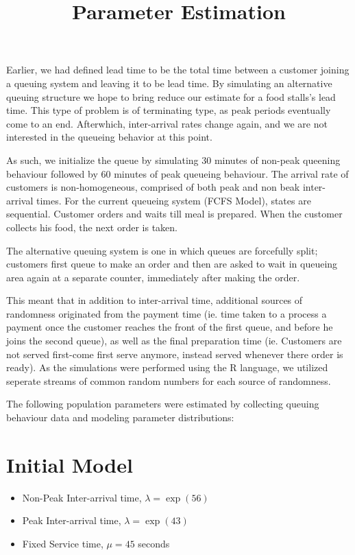 \documentclass{article}
\begin{document}
\pagecolor{ultramarine}

\title{Parameter Estimation}
\author{}
\date{}
\maketitle
Earlier, we had defined lead time to be the total time between a customer joining a queuing system and leaving it to be lead time. By simulating an alternative queuing structure we hope to bring reduce our estimate for a food stalls's lead time. This type of problem is of terminating type, as peak periods eventually come to an end. Afterwhich, inter-arrival rates change again, and we are not interested in the queueing behavior at this point.
\newline

As such, we initialize the queue by simulating 30 minutes of non-peak queening behaviour followed by 60 minutes of peak queueing behaviour. The arrival rate of customers is non-homogeneous, comprised of both peak and non beak inter-arrival times.
\newline
For the current queueing system (FCFS Model), states are sequential. Customer orders and waits till meal is prepared. When the customer collects his food, the next order is taken.
\newline

The alternative queuing system is one in which queues are forcefully split; customers first queue to make an order and then are asked to wait in queueing area again at a separate counter, immediately after making the order. 
\newline

This meant that in addition to inter-arrival time, additional sources of randomness originated from the payment time (ie. time taken to a process a payment once the customer reaches the front of the first queue, and before he joins the second queue), as well as the final preparation time (ie. Customers are not served first-come first serve anymore, instead served whenever there order is ready). As the simulations were performed using the R language, we utilized seperate streams of common random numbers for each source of randomness.
\newline

The following population parameters were estimated by collecting queuing behaviour data and modeling parameter distributions:
\section*{Initial Model}
\begin{itemize}
    \item Non-Peak Inter-arrival time, $\lambda = \exp(56)$
    \item Peak Inter-arrival time, $\lambda = \exp(43)$
    \item Fixed Service time, $\mu = 45$ seconds
\end{itemize}
\end{document}

